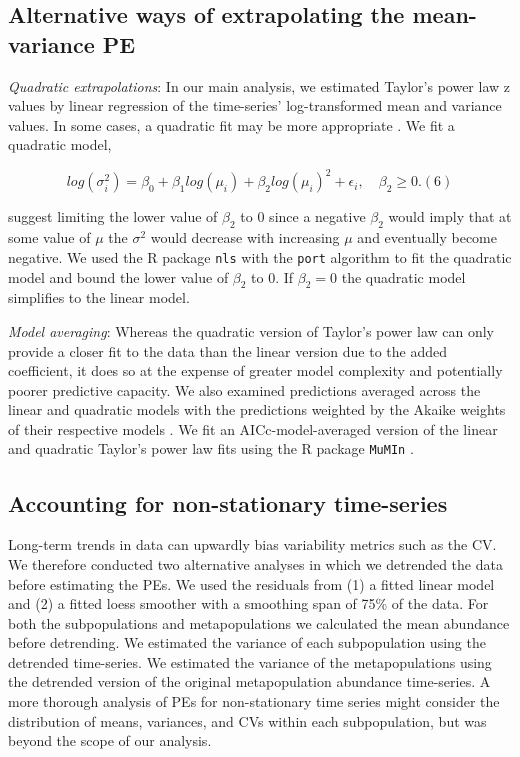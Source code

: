 \subsection{Alternative ways of extrapolating the mean-variance PE}

\textit{Quadratic extrapolations}: In our main analysis, we estimated Taylor's
power law z values by linear regression of the time-series' log-transformed mean
and variance values. In some cases, a quadratic fit may be more appropriate
\citep{routledge1991, perry1992}. We fit a quadratic model,

\begin{equation}
  log(\sigma^2_i) = \beta_0 + \beta_1 log(\mu_i) + \beta_2 log(\mu_i)^2 +
  \epsilon_i, \quad \beta_2 \ge 0. (6)
  \label{eq:quad-taylor}
\end{equation}

\noindent
\citet{perry1992} suggest limiting the lower value of $\beta_2$ to 0 since
a negative $\beta_2$ would imply that at some value of $\mu$ the $\sigma^2$
would decrease with increasing $\mu$ and eventually become negative. We used
the R package \texttt{nls} \citep{r2013} with the \texttt{port} algorithm
to fit the quadratic model and bound the lower value of $\beta_2$ to 0. If
$\beta_2 = 0$ the quadratic model simplifies to the linear model.

\textit{Model averaging}: Whereas the quadratic version of Taylor's power law
can only provide a closer fit to the data than the linear version due to the
added coefficient, it does so at the expense of greater model complexity and
potentially poorer predictive capacity. We also examined predictions averaged
across the linear and quadratic models with the predictions weighted by the
Akaike weights of their respective models \citep{burnham2002}. We fit an
AICc-model-averaged version of the linear and quadratic Taylor's power law fits
using the R package \texttt{MuMIn} \citep{barton2012}.

\subsection{Accounting for non-stationary time-series}

Long-term trends in data can upwardly bias variability metrics such as the CV.
We therefore conducted two alternative analyses in which we detrended
the data before estimating the PEs. We used the residuals from (1) a fitted
linear model and (2) a fitted loess smoother \citep[\texttt{loess}
function;][]{r2013} with a smoothing span of 75\% of the data. For both
the subpopulations and metapopulations we calculated the mean abundance before
detrending. We estimated the variance of each subpopulation using the detrended
time-series. We estimated the variance of the metapopulations using the
detrended version of the original metapopulation abundance time-series.
A more thorough analysis of PEs for non-stationary time series might
consider the distribution of means, variances, and CVs within each
subpopulation, but was beyond the scope of our analysis.

